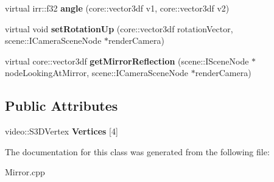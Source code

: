 \begin{DoxyCompactItemize}
\item 
\hypertarget{class_c_mirror_a2a57f308972d764b420027ee3b121bc4}{
virtual irr::f32 {\bfseries angle} (core::vector3df v1, core::vector3df v2)}
\label{class_c_mirror_a2a57f308972d764b420027ee3b121bc4}

\item 
\hypertarget{class_c_mirror_a2a007d12c24891c5c8182c96a3343f05}{
virtual void {\bfseries setRotationUp} (core::vector3df rotationVector, scene::ICameraSceneNode $\ast$renderCamera)}
\label{class_c_mirror_a2a007d12c24891c5c8182c96a3343f05}

\item 
\hypertarget{class_c_mirror_a2d9f2b6e0d72f02b3dceb76d30c25f37}{
virtual core::vector3df {\bfseries getMirrorReflection} (scene::ISceneNode $\ast$nodeLookingAtMirror, scene::ICameraSceneNode $\ast$renderCamera)}
\label{class_c_mirror_a2d9f2b6e0d72f02b3dceb76d30c25f37}

\end{DoxyCompactItemize}
\subsection*{Public Attributes}
\begin{DoxyCompactItemize}
\item 
\hypertarget{class_c_mirror_a97c519f1c802a2370b9841b6140102a7}{
video::S3DVertex {\bfseries Vertices} \mbox{[}4\mbox{]}}
\label{class_c_mirror_a97c519f1c802a2370b9841b6140102a7}

\end{DoxyCompactItemize}


The documentation for this class was generated from the following file:\begin{DoxyCompactItemize}
\item 
Mirror.cpp\end{DoxyCompactItemize}
